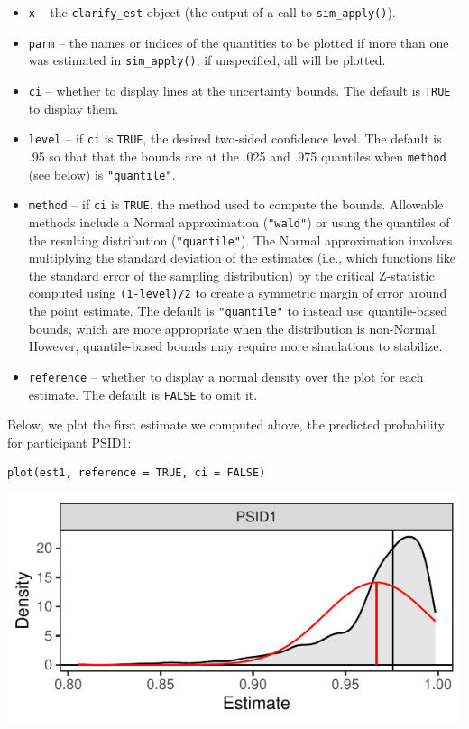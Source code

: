 \begin{itemize}
\item
  \texttt{x} -- the \texttt{clarify\_est} object (the output of a call to \texttt{sim\_apply()}).
\item
  \texttt{parm} -- the names or indices of the quantities to be plotted if more than one was estimated in \texttt{sim\_apply()}; if unspecified, all will be plotted.
\item
  \texttt{ci} -- whether to display lines at the uncertainty bounds. The default is \texttt{TRUE} to display them.
\item
  \texttt{level} -- if \texttt{ci} is \texttt{TRUE}, the desired two-sided confidence level. The default is .95 so that that the bounds are at the .025 and .975 quantiles when \texttt{method} (see below) is \texttt{"quantile"}.
\item
  \texttt{method} -- if \texttt{ci} is \texttt{TRUE}, the method used to compute the bounds. Allowable methods include a Normal approximation (\texttt{"wald"}) or using the quantiles of the resulting distribution (\texttt{"quantile"}). The Normal approximation involves multiplying the standard deviation of the estimates (i.e., which functions like the standard error of the sampling distribution) by the critical Z-statistic computed using \texttt{(1-level)/2} to create a symmetric margin of error around the point estimate. The default is \texttt{"quantile"} to instead use quantile-based bounds, which are more appropriate when the distribution is non-Normal. However, quantile-based bounds may require more simulations to stabilize.
\item
  \texttt{reference} -- whether to display a normal density over the plot for each estimate. The default is \texttt{FALSE} to omit it.
\end{itemize}

Below, we plot the first estimate we computed above, the predicted probability for participant PSID1:

\begin{verbatim}
plot(est1, reference = TRUE, ci = FALSE)
\end{verbatim}

\begin{center}\includegraphics{figures/unnamed-chunk-8-1} \end{center}

